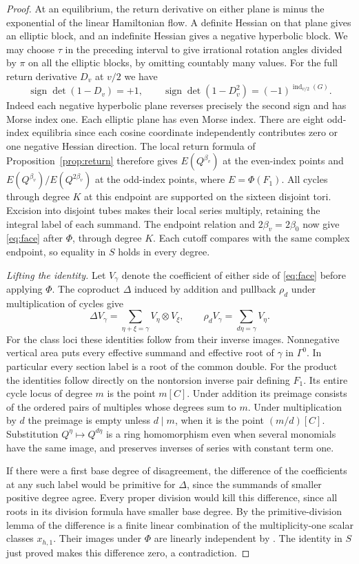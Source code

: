 \begin{proof}
At an equilibrium, the return derivative on either plane is minus
the exponential of the linear Hamiltonian flow. A definite Hessian
on that plane gives an elliptic block, and an indefinite Hessian
gives a negative hyperbolic block. We may choose $\tau$ in the
preceding interval to give irrational rotation angles divided by
$\pi$ on all the elliptic blocks, by omitting countably many values.
For the full return derivative $D_v$ at $v/2$ we have
\[
 \operatorname{sign}\det(1-D_v)=+1,\qquad
 \operatorname{sign}\det(1-D_v^2)=(-1)^{\operatorname{ind}_{v/2}(G)} .
\]
Indeed each negative hyperbolic plane reverses precisely the second
sign and has Morse index one. Each elliptic plane has even Morse
index. There are eight odd-index equilibria since each cosine
coordinate independently contributes zero or one negative Hessian
direction. The local return formula of Proposition~\ref{prop:return}
therefore gives $E(Q^{\beta_v})$ at the even-index points and
$E(Q^{\beta_v})/E(Q^{2\beta_v})$ at the odd-index points,
where $E=\Phi(F_1)$. All cycles through degree $K$ at this endpoint
are supported on the sixteen disjoint tori. Excision into disjoint
tubes makes their local series multiply, retaining the integral
label of each summand. The endpoint relation and $2\beta_v=2\beta_0$
now give \eqref{eq:face} after $\Phi$, through degree $K$. Each
cutoff compares with the same complex endpoint, so equality in $S$
holds in every degree.

\smallskip
\noindent\emph{Lifting the identity.}
Let $V_\gamma$ denote the coefficient of either side of
\eqref{eq:face} before applying $\Phi$. The coproduct $\Delta$
induced by addition and pullback $\rho_d$ under multiplication of
cycles give
\[
 \Delta V_\gamma=
    \sum_{\eta+\xi=\gamma}V_\eta\otimes V_\xi,\qquad
 \rho_d V_\gamma=\sum_{d\eta=\gamma}V_\eta .
\]
For the class loci these identities follow from their inverse images.
Nonnegative vertical area puts every effective summand and effective
root of $\gamma$ in $\Gamma^0$. In particular every section label
is a root of the common double. For the product the identities follow
directly on the nontorsion inverse pair defining $F_1$. Its entire cycle
locus of degree $m$ is the point $m[C]$. Under addition its preimage
consists of the ordered pairs of multiples whose degrees sum to $m$.
Under multiplication by $d$ the preimage is empty unless $d\mid m$,
when it is the point $(m/d)[C]$. Substitution $Q^\eta\mapsto Q^{d\eta}$ is a
ring homomorphism even when several monomials have the same image, and
preserves inverses of series with constant term one.

If there were a first base degree of disagreement, the difference
of the coefficients at any such label would be primitive for
$\Delta$, since the summands of smaller positive degree agree.
Every proper division would kill this difference, since all roots
in its division formula have smaller base degree. By the
primitive-division lemma of \cite[Lemma~7.1]{WueProduct} the difference
is a finite linear combination of the multiplicity-one scalar
classes $x_{h,1}$. Their images under $\Phi$ are linearly
independent by \cite[Theorem~5.1]{WueProduct}. The identity in $S$ just
proved makes this difference zero, a contradiction.
\end{proof}

